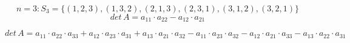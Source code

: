 \begin{example}
    $$n = 3: S_3=\{(1,2,3), (1,3,2), (2,1,3), (2,3,1), (3,1,2), (3,2,1)\}$$
    $$det\,A = a_{11} \cdot a_{22} - a_{12} \cdot a_{21}$$

    $$det\,A = a_{11}\cdot a_{22}\cdot a_{33} +
               a_{12}\cdot a_{23}\cdot a_{31} +
               a_{13}\cdot a_{21}\cdot a_{32} -
               a_{11}\cdot a_{23}\cdot a_{32} -
               a_{12}\cdot a_{21}\cdot a_{33} -
               a_{13}\cdot a_{22}\cdot a_{31}
    $$
\end{example}

\begin{definition}

\end{definition}


